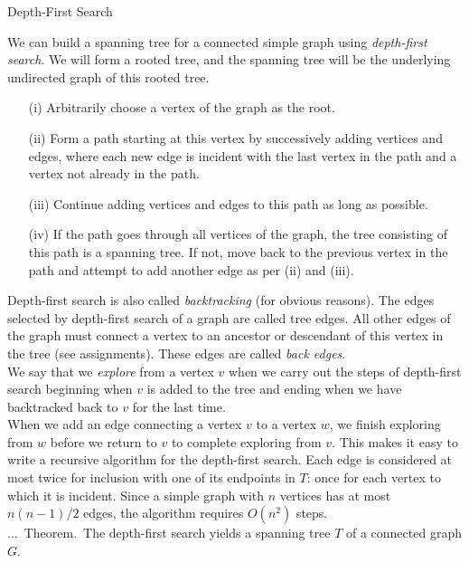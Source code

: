 \documentclass[smaller,hyperref={CJKbookmarks=true}]{beamer}
\newcounter{zhuo}[subsection]
\renewcommand{\thezhuo}{\thesection.\thesubsection.\arabic{zhuo}}
\newenvironment{THEOREM}{\stepcounter{zhuo}\alert{\thezhuo.~Theorem.\,}}{}
\begin{document}
\begin{frame}{Depth-First Search}
\begin{spacing}{1.1}
We can build a spanning tree for a connected simple graph using
\emph{depth-first search}. We will form a rooted tree, and the spanning tree will
be the underlying undirected graph of this rooted tree.
\begin{itemize}
  \item[(i)] Arbitrarily choose a vertex of the graph as the root.
  \item[(ii)] Form a path starting at this vertex by successively adding vertices and edges, where each new edge is incident with the last vertex in the path and a vertex not already in the path.
  \item[(iii)] Continue adding vertices and edges to this path as long as possible.
  \item[(iv)] If the path goes through all vertices of the graph, the tree consisting of this path is a spanning tree. If not, move back to the previous vertex in the path and attempt to add another edge as per (ii) and (iii).
\end{itemize}
\newpage
\vspace*{10pt}
Depth-first search is also called \emph{backtracking} (for obvious reasons). The
edges selected by depth-first search of a graph are called tree edges. All
other edges of the graph must connect a vertex to an ancestor or
descendant of this vertex in the tree (see assignments). These edges are
called \emph{back edges}.\\[7pt]
We say that we \emph{explore} from a vertex $v$ when we carry out the steps of
depth-first search beginning when $v$ is added to the tree and ending when
we have backtracked back to $v$ for the last time.\\[7pt]
When we add an edge connecting a vertex $v$ to a vertex $w$, we finish
exploring from $w$ before we return to $v$ to complete exploring from $v$. This
makes it easy to write a recursive algorithm for the depth-first search.
\newpage
Each edge is considered at most twice for inclusion with one of its
endpoints in $T$: once for each vertex to which it is incident. Since a
simple graph with $n$ vertices has at most $n(n-1)/2$ edges, the algorithm requires $O(n^2)$ steps.\\[6pt]
\begin{THEOREM}
The depth-first search yields a spanning tree $T$ of a connected graph $G$.\\[7pt]

\end{THEOREM}
\end{spacing}
\end{frame}
\end{document}

